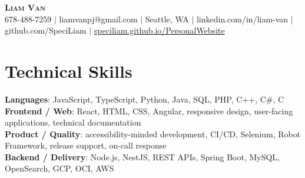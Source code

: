 \documentclass[letterpaper,11pt]{article}
\begin{document}

%
\begin{center}
    \textbf{\Huge \scshape Liam Van} \\ \vspace{1pt}
    \small 678-488-7259 $|$ \small {liamvanpj@gmail.com} $|$ Seattle, WA
 {{$|$ linkedin.com/in/liam-van} {$|$ github.com/SpeciLiam} {$|$ \href{https://speciliam.github.io/PersonalWebsite}{speciliam.github.io/PersonalWebsite}}}

\end{center}

\section{Technical Skills}
 \begin{itemize}[leftmargin=0.15in, label={}]
    \small{\item{
     \textbf{Languages}{: JavaScript, TypeScript, Python, Java, SQL, PHP, C++, C\#, C} \\
     \textbf{Frontend / Web}{: React, HTML, CSS, Angular, responsive design, user-facing applications, technical documentation} \\
     \textbf{Product / Quality}{: accessibility-minded development, CI/CD, Selenium, Robot Framework, release support, on-call response} \\
     \textbf{Backend / Delivery}{: Node.js, NestJS, REST APIs, Spring Boot, MySQL, OpenSearch, GCP, OCI, AWS} \\
    }}
 \end{itemize}
%
\end{document}
